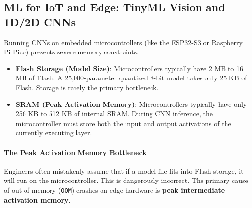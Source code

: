 \subsection{ML for IoT and Edge: TinyML Vision and 1D/2D CNNs}\label{subsec:iot_tinyml}

\begin{iotbox}
Running CNNs on embedded microcontrollers (like the ESP32-S3 or Raspberry Pi Pico) presents severe memory constraints:
\begin{itemize}
    \item \textbf{Flash Storage (Model Size)}: Microcontrollers typically have 2 MB to 16 MB of Flash. A 25,000-parameter quantized 8-bit model takes only 25 KB of Flash. Storage is rarely the primary bottleneck.
    \item \textbf{SRAM (Peak Activation Memory)}: Microcontrollers typically have only 256 KB to 512 KB of internal SRAM. During CNN inference, the microcontroller must store both the input and output activations of the currently executing layer.
\end{itemize}
\end{iotbox}

\paragraph{The Peak Activation Memory Bottleneck}
Engineers often mistakenly assume that if a model file fits into Flash storage, it will run on the microcontroller. This is dangerously incorrect. The primary cause of out-of-memory (\texttt{OOM}) crashes on edge hardware is \textbf{peak intermediate activation memory}.

